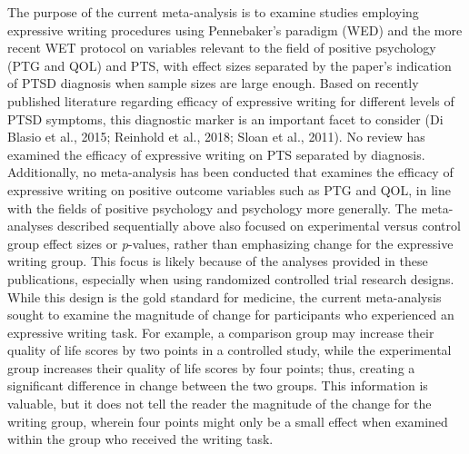 \documentclass[man]{apa6}
\theoremstyle{definition}
\theoremstyle{definition}
\theoremstyle{definition}
\theoremstyle{remark}
\begin{document}
The purpose of the current meta-analysis is to examine studies employing
expressive writing procedures using Pennebaker's paradigm (WED) and the
more recent WET protocol on variables relevant to the field of positive
psychology (PTG and QOL) and PTS, with effect sizes separated by the
paper's indication of PTSD diagnosis when sample sizes are large enough.
Based on recently published literature regarding efficacy of expressive
writing for different levels of PTSD symptoms, this diagnostic marker is
an important facet to consider (Di Blasio et al., 2015; Reinhold et al.,
2018; Sloan et al., 2011). No review has examined the efficacy of
expressive writing on PTS separated by diagnosis. Additionally, no
meta-analysis has been conducted that examines the efficacy of
expressive writing on positive outcome variables such as PTG and QOL, in
line with the fields of positive psychology and psychology more
generally. The meta-analyses described sequentially above also focused
on experimental versus control group effect sizes or \emph{p}-values,
rather than emphasizing change for the expressive writing group. This
focus is likely because of the analyses provided in these publications,
especially when using randomized controlled trial research designs.
While this design is the gold standard for medicine, the current
meta-analysis sought to examine the magnitude of change for participants
who experienced an expressive writing task. For example, a comparison
group may increase their quality of life scores by two points in a
controlled study, while the experimental group increases their quality
of life scores by four points; thus, creating a significant difference
in change between the two groups. This information is valuable, but it
does not tell the reader the magnitude of the change for the writing
group, wherein four points might only be a small effect when examined
within the group who received the writing task.
\end{document}
